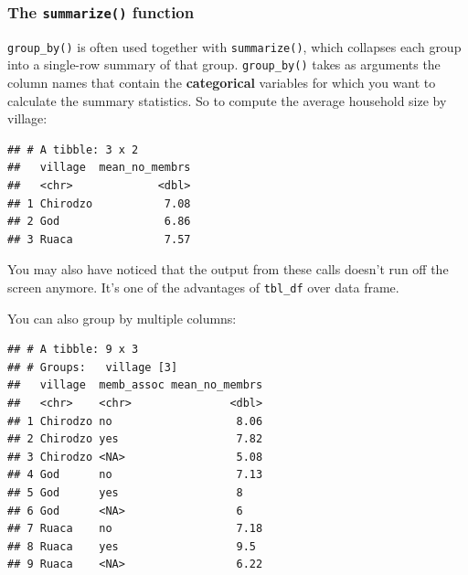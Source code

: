 \documentclass[]{book}
\newenvironment{Shaded}{\begin{snugshade}}{\end{snugshade}}
\newcommand{\KeywordTok}[1]{\textcolor[rgb]{0.13,0.29,0.53}{\textbf{#1}}}
\newcommand{\DataTypeTok}[1]{\textcolor[rgb]{0.13,0.29,0.53}{#1}}
\newcommand{\StringTok}[1]{\textcolor[rgb]{0.31,0.60,0.02}{#1}}
\newcommand{\OperatorTok}[1]{\textcolor[rgb]{0.81,0.36,0.00}{\textbf{#1}}}
\newcommand{\NormalTok}[1]{#1}
\begin{document}
\subsubsection{\texorpdfstring{The \texttt{summarize()}
function}{The summarize() function}}\label{the-summarize-function}

\texttt{group\_by()} is often used together with \texttt{summarize()},
which collapses each group into a single-row summary of that group.
\texttt{group\_by()} takes as arguments the column names that contain
the \textbf{categorical} variables for which you want to calculate the
summary statistics. So to compute the average household size by village:

\begin{Shaded}
\end{Shaded}

\begin{verbatim}
## # A tibble: 3 x 2
##   village  mean_no_membrs
##   <chr>             <dbl>
## 1 Chirodzo           7.08
## 2 God                6.86
## 3 Ruaca              7.57
\end{verbatim}

You may also have noticed that the output from these calls doesn't run
off the screen anymore. It's one of the advantages of \texttt{tbl\_df}
over data frame.

You can also group by multiple columns:

\begin{Shaded}
\end{Shaded}

\begin{verbatim}
## # A tibble: 9 x 3
## # Groups:   village [3]
##   village  memb_assoc mean_no_membrs
##   <chr>    <chr>               <dbl>
## 1 Chirodzo no                   8.06
## 2 Chirodzo yes                  7.82
## 3 Chirodzo <NA>                 5.08
## 4 God      no                   7.13
## 5 God      yes                  8   
## 6 God      <NA>                 6   
## 7 Ruaca    no                   7.18
## 8 Ruaca    yes                  9.5 
## 9 Ruaca    <NA>                 6.22
\end{verbatim}
\end{document}
